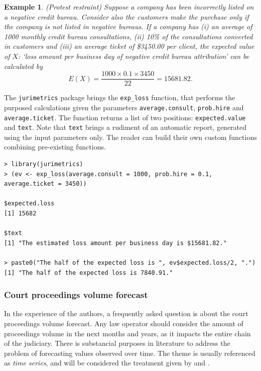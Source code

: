 \documentclass[a4paper]{exam}
\theoremstyle{plain}
\newtheorem{example}{Example}
\begin{document}
\begin{example}\label{exe:pi} (Protest restraint) Suppose a company has been incorrectly listed on a negative credit bureau. Consider also the customers make the purchase only if the company is not listed in negative bureaus. If a company has (i) an average of 1000 monthly credit bureau consultations, (ii) 10\% of the consultations converted in customers and (iii) an average ticket of \$3450.00 per client, the expected value of $X$: `loss amount per business day of negative credit bureau attribution' can be calculated by \[E(X) = \dfrac{1000 \times 0.1 \times 3450}{22} = 15681.82.\] 
\end{example}

The \texttt{jurimetrics} package brings the \texttt{exp\_loss} function, that performs the purposed calculations given the parameters \texttt{average.consult}, \texttt{prob.hire} and \texttt{average.ticket}. The function returns a list of two positions: \texttt{expected.value} and \texttt{text}. Note that \texttt{text} brings a rudiment of an automatic report, generated using the input parameters only. The reader can build their own custom functions combining pre-existing functions.

\begin{tcolorbox}[colback=black, coltext=white]
\begingroup
\fontsize{9pt}{9pt}\selectfont
\begin{verbatim}
> library(jurimetrics)
> (ev <- exp_loss(average.consult = 1000, prob.hire = 0.1, average.ticket = 3450))

$expected.loss
[1] 15682

$text
[1] "The estimated loss amount per business day is $15681.82."

> paste0("The half of the expected loss is ", ev$expected.loss/2, ".")
[1] "The half of the expected loss is 7840.91."
\end{verbatim}
\endgroup
\end{tcolorbox}
\smiley


\subsubsection{Court proceedings volume forecast}\label{sec:pvf}

In the experience of the authors, a frequently asked question is about the court proceedings volume forecast. Any law operator should consider the amount of proceedings volume in the next months and years, as it impacts the entire chain of the judiciary. There is substancial purposes in literature to address the problem of forecasting values observed over time. The theme is usually referenced as \textit{time series}, and will be considered the treatment given by \cite{hyndman2018forecasting} and \cite{hyndman2018fpp2}.
\end{document}
